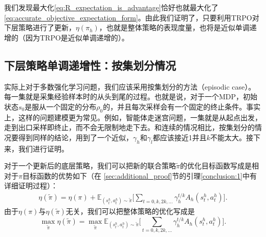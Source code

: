 我们发现最大化\eqref{eq:R_expectation_is_advantage}恰好也就最大化了\eqref{eq:accurate_objective_expectation_form}。由此我们证明了，只要利用TRPO对下层策略进行了更新，$\eta(\pi_h)$，也就是整体策略的表现度量，也将是近似单调递增的（因为TRPO是近似单调递增的）。

\subsection{下层策略单调递增性：按集划分情况}
实际上对于多数强化学习问题，我们应该采用按集划分的方法（episodic case）。每一集就是采集经验样本时的从头到尾的过程。也就是说，对于一个MDP，初始状态$s_0$是服从一个固定的分布$\rho_0$的，并且每次采样会有一个固定的终止条件。事实上，这样的问题建模更为常见。例如，智能体走迷宫问题，一集就是从起点出发，走到出口采样即终止，而不会无限制地走下去。和连续的情况相比，按集划分的情况要得到同样的结论，用到了一个近似，$\gamma_h$和$\gamma_l$都应该接近1并且$k$不能太大。接下来，我们进行证明。

对于一个更新后的底层策略，我们可以把新的联合策略$\tilde\pi$的优化目标函数写成是相对于$\pi$目标函数的优势如下（在 \ref{sec:additional_proof}节的引理\ref{conclusion:1}中有详细证明过程）：
    \begin{equation}
        \begin{aligned}
        \eta(\tilde\pi) =  \eta(\pi)+ \mathbb{E}_{(s_t^h,a_t^h)\sim \tilde\pi}
        \Bigg[\sum_{t=0,k,2k,...} \gamma_h^{t/k} A_h(s_t^h, a_t^h)\Bigg].
        \end{aligned}
    \end{equation}
    由于$\eta(\pi)$与$\eta(\tilde{\pi})$无关，我们可以把整体策略的优化写成是
    \begin{equation}\label{eq:jp_oj}
        \max_{\tilde{\pi}} \eta(\tilde\pi)=\max_{\tilde{\pi}} 
        \mathbb{E}_{(s_t^h,a_t^h)\sim\tilde\pi}
        \Bigg[\sum_{t=0,k,2k,...} \gamma_h^{t/k} A_h(s_t^h, a_t^h)\Bigg].
    \end{equation}
    
